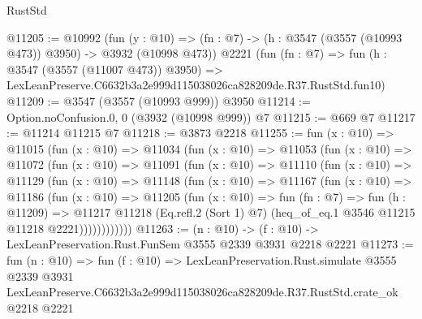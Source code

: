 \begin{lexlean}{RustStd}
\begin{coremodule}
@11205 := @10992
    (fun (y : @10) => (fn : @7) -> (h : @3547 (@3557 (@10993 @473)) @3950) -> @3932 (@10998 @473))
    @2221
    (fun (fn : @7) =>
    fun (h : @3547 (@3557 (@11007 @473)) @3950) =>
    LexLeanPreserve.C6632b3a2e999d115038026ca828209de.R37.RustStd.fun10)
@11209 := @3547 (@3557 (@10993 @999)) @3950
@11214 := Option.noConfusion.{0, 0} (@3932 (@10998 @999)) @7
@11215 := @669 @7
@11217 := @11214 @11215 @7
@11218 := @3873 @2218
@11255 := fun (x : @10) =>
  @11015
    (fun (x : @10) =>
    @11034
      (fun (x : @10) =>
      @11053
        (fun (x : @10) =>
        @11072
          (fun (x : @10) =>
          @11091
            (fun (x : @10) =>
            @11110
              (fun (x : @10) =>
              @11129
                (fun (x : @10) =>
                @11148
                  (fun (x : @10) =>
                  @11167
                    (fun (x : @10) =>
                    @11186
                      (fun (x : @10) =>
                      @11205
                        (fun (x : @10) =>
                        fun (fn : @7) =>
                        fun (h : @11209) =>
                        @11217
                          @11218
                          (Eq.refl.{2} (Sort 1) @7)
                          (heq_of_eq.{1} @3546 @11215 @11218 @2221))))))))))))
@11263 := (n : @10) -> (f : @10) -> LexLeanPreservation.Rust.FunSem @3555 @2339 @3931 @2218 @2221
@11273 := fun (n : @10) =>
  fun (f : @10) =>
  LexLeanPreservation.Rust.simulate
    @3555
    @2339
    @3931
    LexLeanPreserve.C6632b3a2e999d115038026ca828209de.R37.RustStd.crate_ok
    @2218
    @2221
\end{coremodule}
\end{lexlean}
